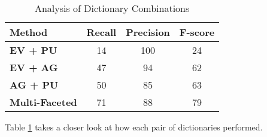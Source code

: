 
\begin{table}[ht]
\small
\centering
\begin{tabular}[center]{|lccc|} \hline
{\bf Method} & {\bf Recall} & {\bf Precision} & {\bf F-score}\\ \hline 
                                                     
{\bf EV + PU} & 14 & 100 & 24\\
{\bf EV + AG} & 47 & 94 & 62\\
{\bf AG + PU} & 50 & 85 & 63\\ \hline
{\bf Multi-Faceted} & 71 & 88 & 79\\ \hline

\end{tabular}
\caption{Analysis of Dictionary Combinations}
\label{ablation-table}
\end{table}
Table \ref{ablation-table} takes a closer look at how each pair of dictionaries performed. 
